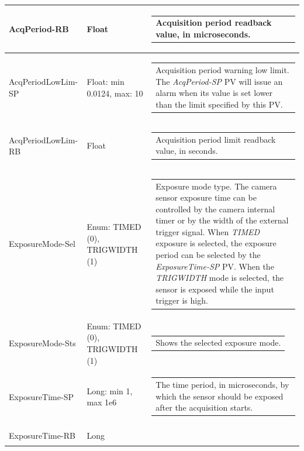 \documentclass[openany]{article}
\begin{document}
\begin{longtable}{| m{3.0cm} m{4.5cm}  m{7.0cm} |}
        AcqPeriod-RB & Float & \begin{tabular}{@{}m{6cm}@{}}
                Acquisition period readback value, in microseconds.
            \end{tabular} \hypertarget{pv:acq-period-lim}{}\\ \hline
        AcqPeriodLowLim-SP & Float: min 0.0124, max: 10 & \begin{tabular}{@{}m{6cm}@{}}
                Acquisition period warning low limit. The \emph{AcqPeriod-SP} PV will
                issue an alarm when its value is set lower than the limit specified by
                this PV.
            \end{tabular} \\ \hline
        AcqPeriodLowLim-RB & Float & \begin{tabular}{@{}m{6cm}@{}}
                Acquisition period limit readback value, in seconds.
            \end{tabular} \hypertarget{pv:exp-mode}{}\\ \hline
        ExposureMode-Sel & Enum: TIMED (0), TRIGWIDTH (1) & \begin{tabular}{@{}m{6cm}@{}}
                Exposure mode type. The camera sensor exposure time can be controlled
                by the camera internal timer or by the width of the external trigger
                signal. When \emph{TIMED} exposure is selected, the exposure period can
                be selected by the \emph{ExposureTime-SP} PV. When the \emph{TRIGWIDTH}
                mode is selected, the sensor is exposed while the input trigger is high.
            \end{tabular} \\ \hline
        ExposureMode-Sts & Enum: TIMED (0), TRIGWIDTH (1) & \begin{tabular}{@{}m{6cm}@{}}
                Shows the selected exposure mode.
            \end{tabular} \hypertarget{pv:exp-time}{}\\ \hline
        ExposureTime-SP & Long: min 1, max 1e6 & \begin{tabular}{@{}m{6cm}@{}}
                The time period, in microseconds, by which the sensor should be exposed 
                after the acquisition starts.
            \end{tabular} \\ \hline
        ExposureTime-RB & Long & \begin{tabular}{@{}m{6cm}@{}}

\end{tabular}
\end{longtable}
\end{document}
